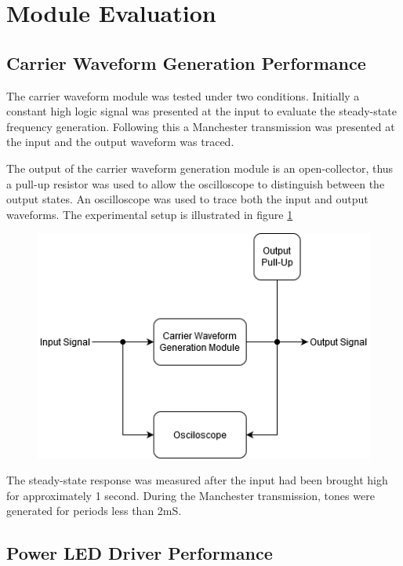 


\section{Module Evaluation}

\subsection{Carrier Waveform Generation Performance}
The carrier waveform module was tested under two conditions. Initially a constant high logic signal was presented at the input to evaluate the steady-state frequency generation. Following this a Manchester transmission was presented at the input and the output waveform was traced.

The output of the carrier waveform generation module is an open-collector, thus a pull-up resistor was used to allow the oscilloscope to distinguish between the output states. An oscilloscope was used to trace both the input and output waveforms. The experimental setup is illustrated in figure \ref{fig:carrier_generation_module_experiment_setup}

\begin{figure}[H]
	\centering
	\includegraphics[width=.5\linewidth]{figures/experimentation/carrier_generation_module_experiment.png}
	\label{fig:carrier_generation_module_experiment_setup}
\end{figure}

The steady-state response was measured after the input had been brought high for approximately 1 second. During the Manchester transmission, tones were generated for periods less than 2mS.





\subsection{Power LED Driver Performance}

